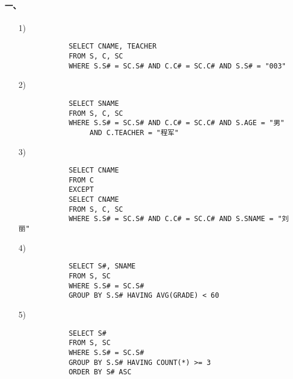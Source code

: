 \documentclass[10pt,a4paper]{article}
\begin{document}
	\pagestyle{main}    %
	
	\setlength{\parskip}{0pt}
	\renewcommand{\baselinestretch}{1.5}
	
    \paragraph{一、}
    \begin{enumerate}
        \item[1)] 
        \begin{verbatim}
            SELECT CNAME, TEACHER
            FROM S, C, SC
            WHERE S.S# = SC.S# AND C.C# = SC.C# AND S.S# = "003"
        \end{verbatim}
        \item[2)]\begin{verbatim}
            SELECT SNAME
            FROM S, C, SC
            WHERE S.S# = SC.S# AND C.C# = SC.C# AND S.AGE = "男"
                 AND C.TEACHER = "程军"
        \end{verbatim}
        \item[3)]\begin{verbatim}
            SELECT CNAME
            FROM C
            EXCEPT
            SELECT CNAME
            FROM S, C, SC
            WHERE S.S# = SC.S# AND C.C# = SC.C# AND S.SNAME = "刘丽"
        \end{verbatim}
        \item[4)]\begin{verbatim}
            SELECT S#, SNAME
            FROM S, SC
            WHERE S.S# = SC.S#
            GROUP BY S.S# HAVING AVG(GRADE) < 60
        \end{verbatim}
        \item[5)]\begin{verbatim}
            SELECT S#
            FROM S, SC
            WHERE S.S# = SC.S#
            GROUP BY S.S# HAVING COUNT(*) >= 3
            ORDER BY S# ASC
        \end{verbatim}
    \end{enumerate}
    
\end{document}
